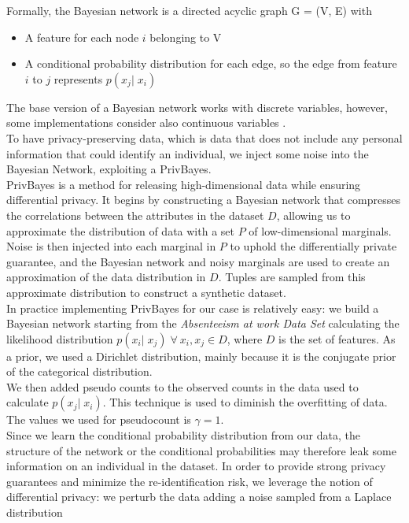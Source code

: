 Formally, the Bayesian network is a directed acyclic graph G = (V, E) with
\begin{itemize}
    \item A feature for each node $i$ belonging to V
    \item A conditional probability distribution for each edge, so the edge from feature $i$ to $j$ represents $p(x_j|\;x_i)$
  \end{itemize}
The base version of a Bayesian network works with discrete variables, however, some implementations consider also continuous variables \cite{chen2017learning}.\\
To have privacy-preserving data, which is data that does not include any personal information that could identify an individual, we inject some noise into the Bayesian Network, exploiting a PrivBayes\cite{zhang2017privbayes}. \\
PrivBayes is a method for releasing high-dimensional data while ensuring differential privacy. It begins by constructing a Bayesian network that compresses the correlations between the attributes in the dataset $D$, allowing us to approximate the distribution of data with a set $P$ of low-dimensional marginals. Noise is then injected into each marginal in $P$ to uphold the differentially private guarantee, and the Bayesian network and noisy marginals are used to create an approximation of the data distribution in $D$. Tuples are sampled from this approximate distribution to construct a synthetic dataset. \\
In practice implementing PrivBayes for our case is relatively easy: we build a Bayesian network starting from the \textit{Absenteeism at work Data Set} calculating the likelihood distribution $p(x_i|\;x_j)\;\forall\:x_i, x_j \in D$, where $D$ is the set of features. As a prior, we used a Dirichlet distribution, mainly because it is the conjugate prior of the categorical distribution. \\
We then added pseudo counts to the observed counts in the data used to calculate $p(x_j|\;x_i)$. This technique is used to diminish the overfitting of data. The values we used for pseudocount is $\gamma=1$. \\
Since we learn the conditional probability distribution from our data, the structure of the network or the conditional probabilities may therefore leak some information on an individual in the dataset. In order to provide strong privacy guarantees and minimize the re-identification risk, we leverage the notion of differential privacy: we perturb the data adding a noise sampled from a Laplace distribution 
